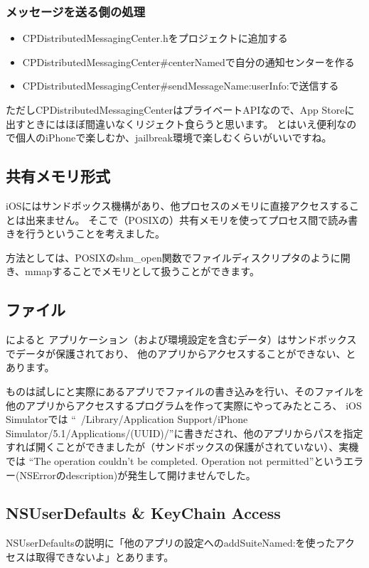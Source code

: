 \subsubsection{メッセージを送る側の処理}
\begin{itemize}
  \item CPDistributedMessagingCenter.hをプロジェクトに追加する
  \item CPDistributedMessagingCenter\#centerNamedで自分の通知センターを作る
  \item CPDistributedMessagingCenter\#sendMessageName:userInfo:で送信する
\end{itemize}

ただしCPDistributedMessagingCenterはプライベートAPIなので、App Storeに出すときにはほぼ間違いなくリジェクト食らうと思います。
とはいえ便利なので個人のiPhoneで楽しむか、jailbreak環境で楽しむくらいがいいですね。

\subsection{共有メモリ形式}
iOSにはサンドボックス機構があり、他プロセスのメモリに直接アクセスすることは出来ません。
そこで（POSIXの）共有メモリを使ってプロセス間で読み書きを行うということを考えました。

方法としては、POSIXのshm\_open関数でファイルディスクリプタのように開き、mmapすることでメモリとして扱うことができます。

\subsection{ファイル}
によると
アプリケーション（および環境設定を含むデータ）はサンドボックスでデータが保護されており、
他のアプリからアクセスすることができない、とあります。

ものは試しにと実際にあるアプリでファイルの書き込みを行い、そのファイルを他のアプリからアクセスするプログラムを作って実際にやってみたところ、
iOS Simulatorでは
``~/Library/Application Support/iPhone Simulator/5.1/Applications/(UUID)/''に書きだされ、他のアプリからパスを指定すれば開くことができましたが（サンドボックスの保護がされていない）、実機では
``The operation couldn't be completed. Operation not permitted''というエラー(NSErrorのdescription)が発生して開けませんでした。

\subsection{NSUserDefaults \& KeyChain Access}
NSUserDefaultsの説明に「他のアプリの設定へのaddSuiteNamed:を使ったアクセスは取得できないよ」とあります。

